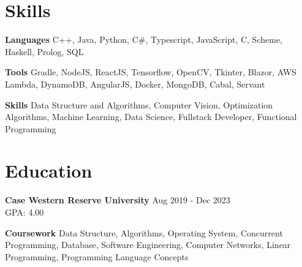\documentclass[11pt]{article}
\begin{document}
\section{Skills}
    \hspace{10pt}\textbf{Languages} {\small C++, Java, Python, C\#, Typescript, JavaScript, C, Scheme, Haskell, Prolog, SQL}

    \hspace{10pt}\textbf{Tools} {\small Gradle, NodeJS, ReactJS, Tensorflow, OpenCV, Tkinter, Blazor, AWS Lambda, DynamoDB, AngularJS, Docker, MongoDB, Cabal, Servant}

    \hspace{10pt}\textbf{Skills} {\small Data Structure and Algorithms, Computer Vision, Optimization Algorithms, Machine Learning, Data Science, Fullstack Developer, Functional Programming}
    \vspace{-10pt}
      
\section{Education}
    \hspace{10pt}\textbf{Case Western Reserve University} \hfill {\small Aug 2019 - Dec 2023}\\
    \hfill GPA: 4.00

    \hspace{10pt}\textbf{Coursework} {\small Data Structure, Algorithms, Operating System, Concurrent Programming, Database, Software Engineering, Computer Networks, Linear Programming, Programming Language Concepts}
\end{document}
